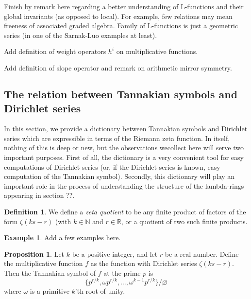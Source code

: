 \documentclass[a4paper]{article}
\theoremstyle{definition}
\newtheorem{definition}{Definition}[section]
\newtheorem{example}{Example}[section]
\newtheorem{proposition}[theorem]{Proposition}
\theoremstyle{remark}
\newtheorem*{remark}{Remark}
\newcommand{\N}{\mathbb{N}}
\begin{document}
Finish by remark here regarding a better understanding of L-functions and their global invariants (as opposed to local). For example, few relations may mean freeness of associated graded algebra. Family of L-functions is just a geometric series (in one of the Sarnak-Luo examples at least).

Add definition of weight operators $h^i$ on multiplicative functions.

Add definition of slope operator and remark on arithmetic mirror symmetry.


\subsection{The relation between Tannakian symbols and Dirichlet series}


In this section, we provide a dictionary between Tannakian symbols and Dirichlet series which are expressible in terms of the Riemann zeta function. In itself, nothing of this is deep or new, but the observations wecollect here will serve two important purposes. First of all, the dictionary is a very convenient tool for easy computations of Dirichlet series (or, if the Dirichlet series is known, easy computation of the Tannakian symbol). Secondly, this dictionary will play an important role in the process of understanding the structure of the lambda-rings appearing in section ??. 

\begin{definition}
We define a \emph{zeta quotient} to be any finite product of factors of the form $\zeta(ks-r)$ (with $k \in \N$ and $r \in \mathbb{R}$, or a quotient of two such finite products. 
\end{definition}


\begin{example}
Add a few examples here.
\end{example}

\begin{proposition}
Let $k$ be a positive integer, and let $r$ be a real number. Define the multiplicative function $f$ as the function with Dirichlet series $\zeta(ks-r)$. Then the Tannakian symbol of $f$ at the prime $p$ is  
$$  \{  p^{r/k}, \omega p^{r/k} , \ldots , \omega^{k-1} p^{r/k} \}   / \varnothing $$
where $\omega$ is a primitive $k$'th root of unity.
\end{proposition} 
\end{document}
